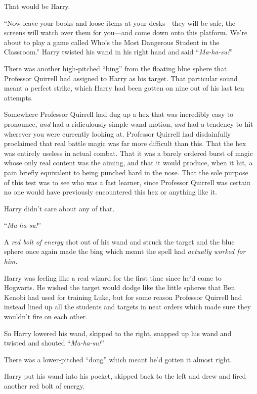 That would be Harry.

“Now leave your books and loose items at your desks—they will be safe, the screens will watch over them for you—and come down onto this platform. We’re about to play a game called Who’s the Most Dangerous Student in the Classroom.”
\sbreak
Harry twisted his wand in his right hand and said “\emph{Ma-ha-su!}”

There was another high-pitched “bing” from the floating blue sphere that Professor Quirrell had assigned to Harry as his target. That particular sound meant a perfect strike, which Harry had been gotten on nine out of his last ten attempts.

Somewhere Professor Quirrell had dug up a hex that was incredibly easy to pronounce, \emph{and} had a ridiculously simple wand motion, \emph{and} had a tendency to hit wherever you were currently looking at. Professor Quirrell had disdainfully proclaimed that real battle magic was far more difficult than this. That the hex was entirely useless in actual combat. That it was a barely ordered burst of magic whose only real content was the aiming, and that it would produce, when it hit, a pain briefly equivalent to being punched hard in the nose. That the sole purpose of this test was to see who was a fast learner, since Professor Quirrell was certain no one would have previously encountered this hex or anything like it.

Harry didn’t care about any of that.

“\emph{Ma-ha-su!}”

A \emph{red bolt of energy} shot out of his wand and struck the target and the blue sphere once again made the bing which meant the spell had \emph{actually worked for him.}

Harry was feeling like a real wizard for the first time since he’d come to Hogwarts. He wished the target would dodge like the little spheres that Ben Kenobi had used for training Luke, but for some reason Professor Quirrell had instead lined up all the students and targets in neat orders which made sure they wouldn’t fire on each other.

So Harry lowered his wand, skipped to the right, snapped up his wand and twisted and shouted “\emph{Ma-ha-su!}”

There was a lower-pitched “dong” which meant he’d gotten it almost right.

Harry put his wand into his pocket, skipped back to the left and drew and fired another red bolt of energy.

